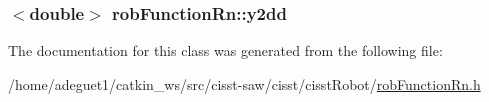 \hypertarget{classrob_function_rn_af67e2c772c0550231dd2b768adbae702}{
\subsubsection[{y2dd}]{$<$double$>$ rob\-Function\-Rn\-::y2dd\hspace{0.3cm}{\ttfamily [protected]}}}\label{classrob_function_rn_af67e2c772c0550231dd2b768adbae702}


The documentation for this class was generated from the following file\-:\begin{DoxyCompactItemize}
\item 
/home/adeguet1/catkin\-\_\-ws/src/cisst-\/saw/cisst/cisst\-Robot/\hyperlink{rob_function_rn_8h}{rob\-Function\-Rn.\-h}\end{DoxyCompactItemize}
